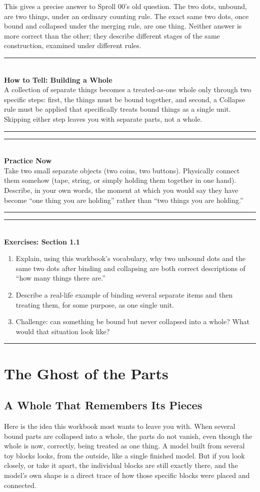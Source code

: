 \documentclass[11pt]{book}
\newenvironment{algorithmproc}[1]{\vspace{0.6em}\noindent\rule{\linewidth}{0.6pt}\\[0.2em]\textbf{How to Tell: #1}\\[0.3em]}{\\[0.2em]\noindent\rule{\linewidth}{0.6pt}\vspace{0.6em}}
\newenvironment{practicenow}{\vspace{0.6em}\noindent\rule{\linewidth}{0.6pt}\\[0.2em]\textbf{Practice Now}\\[0.3em]}{\\[0.2em]\noindent\rule{\linewidth}{0.6pt}\vspace{0.6em}}
\newenvironment{exercisebox}[1]{\vspace{0.8em}\noindent\rule{\linewidth}{0.6pt}\\[0.2em]\textbf{Exercises: #1}\\[0.3em]\begin{enumerate}[label=\arabic*., itemsep=0.4em]}{\end{enumerate}\noindent\rule{\linewidth}{0.6pt}\vspace{0.6em}}
\begin{document}
This gives a precise answer to Sproll 00's old question. The two dots, unbound, are two things, under an ordinary counting rule. The exact same two dots, once bound and collapsed under the merging rule, are one thing. Neither answer is more correct than the other; they describe different stages of the same construction, examined under different rules.

\begin{algorithmproc}{Building a Whole}
A collection of separate things becomes a treated-as-one whole only through two specific steps: first, the things must be bound together, and second, a Collapse rule must be applied that specifically treats bound things as a single unit. Skipping either step leaves you with separate parts, not a whole.
\end{algorithmproc}

\begin{practicenow}
Take two small separate objects (two coins, two buttons). Physically connect them somehow (tape, string, or simply holding them together in one hand). Describe, in your own words, the moment at which you would say they have become ``one thing you are holding'' rather than ``two things you are holding.''
\end{practicenow}

\begin{exercisebox}{Section 1.1}
\item Explain, using this workbook's vocabulary, why two unbound dots and the same two dots after binding and collapsing are both correct descriptions of ``how many things there are.''
\item Describe a real-life example of binding several separate items and then treating them, for some purpose, as one single unit.
\item Challenge: can something be bound but never collapsed into a whole? What would that situation look like?
\end{exercisebox}

\chapter{The Ghost of the Parts}

\section{A Whole That Remembers Its Pieces}

Here is the idea this workbook most wants to leave you with. When several bound parts are collapsed into a whole, the parts do not vanish, even though the whole is now, correctly, being treated as one thing. A model built from several toy blocks looks, from the outside, like a single finished model. But if you look closely, or take it apart, the individual blocks are still exactly there, and the model's own shape is a direct trace of how those specific blocks were placed and connected.
\end{document}

